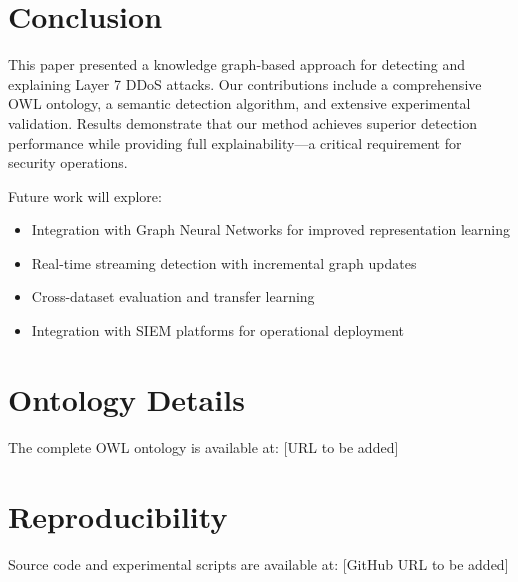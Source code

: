 \documentclass[preprint,12pt]{elsarticle}
\begin{document}
\section{Conclusion}
\label{sec:conclusion}

This paper presented a knowledge graph-based approach for detecting and explaining Layer 7 DDoS attacks. Our contributions include a comprehensive OWL ontology, a semantic detection algorithm, and extensive experimental validation. Results demonstrate that our method achieves superior detection performance while providing full explainability—a critical requirement for security operations.

Future work will explore:
\begin{itemize}
    \item Integration with Graph Neural Networks for improved representation learning
    \item Real-time streaming detection with incremental graph updates
    \item Cross-dataset evaluation and transfer learning
    \item Integration with SIEM platforms for operational deployment
\end{itemize}






\appendix

\section{Ontology Details}
\label{app:ontology}

The complete OWL ontology is available at: [URL to be added]

\section{Reproducibility}
\label{app:reproducibility}

Source code and experimental scripts are available at: [GitHub URL to be added]
\end{document}
